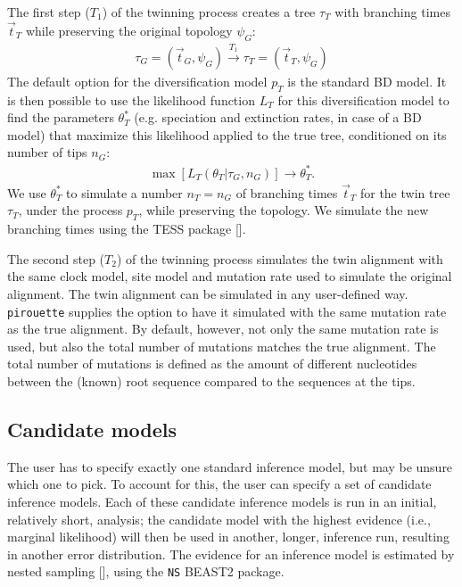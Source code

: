 The first step ($T_1$) of the twinning process creates a tree $\tau_{\mathit{T}}$
with branching times $\Vec{t}_{\mathit{T}}$ while preserving the original
topology $\psi_{\mathit{G}}$:
\begin{align}
  \tau_{\mathit{G}} = (\Vec{t}_{\mathit{G}}, \psi_{\mathit{G}}) 
  \xrightarrow[]{\mathit{T_1}} 
  \tau_{\mathit{T}} = (\Vec{t}_{\mathit{T}}, \psi_{\mathit{G}})
\end{align}
The default option for the diversification model $p_T$ is the standard BD model.
It is then possible to use the likelihood function 
$L_{\mathit{T}}$ for this diversification model to find 
the parameters $\theta^{*}_{\mathit{T}}$ 
(e.g. speciation and extinction rates, in case of a BD model) 
that maximize this likelihood applied 
to the true tree, conditioned on its number of tips $n_{\mathit{G}}$:
\begin{align}
    \max[L_{\mathit{T}}(\theta_{\mathit{T}}|\tau_{\mathit{G}}, n_{\mathit{G}})] 
\rightarrow \theta^{*}_{\mathit{T}}.
\end{align}
We use $\theta^{*}_{\mathit{T}}$ to simulate a number 
$n_{\mathit{T}} = n_{\mathit{G}}$ 
of branching times $\Vec{t}_{\mathit{T}}$ for the twin tree 
$\tau_{\mathit{T}}$, under the process $p_{T}$, 
while preserving the topology. 
We simulate the new branching times using the TESS 
package [\cite{TESS, hohna2016tess}].

The second step ($T_2$) of the twinning process simulates the twin alignment 
with the same clock model, site model and mutation rate 
used to simulate the original alignment. 
The twin alignment can be simulated in any user-defined way.
\verb;pirouette; supplies the option to have it simulated with
the same mutation rate as the true alignment. By default, however,
not only the same mutation rate is used, but also the total number of mutations
matches the true alignment. The total number of mutations is defined
as the amount of different nucleotides between the (known) root sequence
compared to the sequences at the tips.

\subsection{Candidate models}\label{subsec:candidates}

The user has to specify exactly one standard inference model,
but may be unsure which one to pick. To account for this, the user can
specify a set of candidate inference models. Each of these candidate inference models is run in an initial, relatively short, analysis; the candidate model with the highest 
evidence (i.e., marginal likelihood) will then be
used in another, longer, inference run, resulting in another error distribution.
The evidence for an inference model is estimated by nested 
sampling [\cite{russel2019model}], using the \verb;NS; BEAST2 package. 

